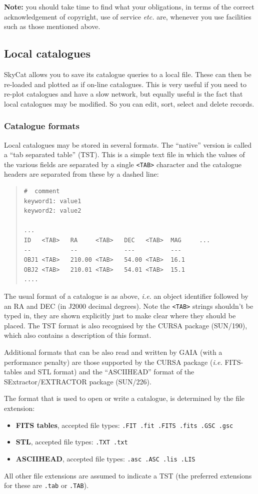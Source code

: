 \documentclass[twoside,11pt]{article}
\newcommand{\xref}[3]{#1}
\renewcommand{\_}{\texttt{\symbol{95}}}
\newcommand{\mytt}[1]{{\texttt{#1}}}
\newcommand{\mybold}[1]{{\textbf{#1}}}
\begin{document}
{\bf Note:} you should take time to find what your obligations, in
terms of the correct acknowledgement of copyright, use of service
{\em etc.} are, whenever you use facilities such as those mentioned
above.

\subsection{Local catalogues}
SkyCat allows you to save its catalogue queries to a local file. These
can then be re-loaded and plotted as if on-line catalogues. This is
very useful if you need to re-plot catalogues and have a slow network,
but equally useful is the fact that local catalogues may be
modified. So you can edit, sort, select and delete records.

\subsubsection{Catalogue formats}
Local catalogues may be stored in several formats. The ``native''
version is called a ``tab separated table'' (TST). This is a simple
text file in which the values of the various fields are separated by a
single \mytt{<TAB>} character and the catalogue headers are separated
from these by a dashed line:
\begin{quote}
\begin{verbatim}
#  comment
keyword1: value1
keyword2: value2

...
ID   <TAB>   RA     <TAB>   DEC   <TAB>  MAG     ...
--           --             ---          ---
OBJ1 <TAB>   210.00 <TAB>   54.00 <TAB>  16.1
OBJ2 <TAB>   210.01 <TAB>   54.01 <TAB>  15.1
....
\end{verbatim}
\end{quote}
The usual format of a catalogue is as above, \textit{i.e.} an object identifier
followed by an RA and DEC (in J2000 decimal degrees). Note the
\mytt{<TAB>} strings shouldn't be typed in, they are shown explicitly
just to make clear where they should be placed. The TST format is also
recognised by the CURSA package (\xref{SUN/190}{sun190}{}), which also
contains a description of this format.

Additional formats that can be also read and written by GAIA (with a
performance penalty) are those supported by the \xref{CURSA}{sun190}{}
package (\textit{i.e.} FITS-tables and STL format) and the
``ASCII\_HEAD'' format of the SExtractor/EXTRACTOR package
(\xref{SUN/226}{sun226}{}).

The format that is used to open or write a catalogue, is determined by
the file extension:
\begin{itemize}
\item \mybold{FITS tables}, accepted file types: \mytt{.FIT .fit .FITS .fits .GSC .gsc}
\item \mybold{STL}, accepted file types: \mytt{.TXT .txt}
\item \mybold{ASCII\_HEAD}, accepted file types: \mytt{.asc .ASC .lis .LIS}
\end{itemize}
All other file extensions are assumed to indicate a TST (the preferred
extensions for these are \mytt{.tab} or \mytt{.TAB}).
\end{document}
